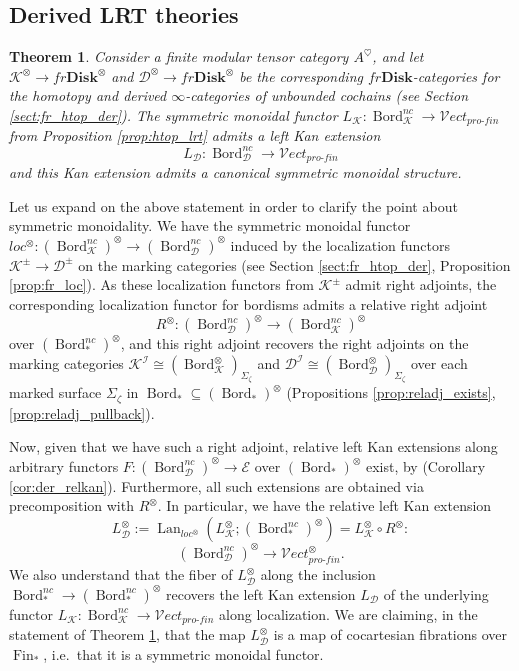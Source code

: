 \documentclass[reqno]{amsart}
\newtheorem{theorem}[lemma]{Theorem}
\theoremstyle{definition}
\newcommand{\mcl}[1]{\mathcal{#1}}
\newcommand{\msc}[1]{\mathscr{#1}}
\newcommand{\opn}[1]{\operatorname{#1}}
\newcommand{\ot}{\otimes}
\newcommand{\Vect}{\msc{V}\!ect}
\newcommand{\Disk}{\mathbf{Disk}}
\newcommand{\pf}{pro\text{-}fin}
\DeclareMathOperator{\Fin}{Fin}
\DeclareMathOperator{\Bord}{Bord}
\renewcommand{\1}{\mathbf{1}}
\begin{document}
\subsection{Derived LRT theories}

\begin{theorem}\label{thm:der_lrt}
Consider a finite modular tensor category $A^{\heartsuit}$, and let $\msc{K}^{\ot}\to fr\Disk^{\ot}$ and $\msc{D}^{\ot}\to fr\Disk^{\ot}$ be the corresponding $fr\Disk$-categories for the homotopy and derived $\infty$-categories of unbounded cochains (see Section \ref{sect:fr_htop_der}).  The symmetric monoidal functor $L_{\msc{K}}:\Bord_{\msc{K}}^{nc}\to \Vect_{\pf}$ from Proposition \ref{prop:htop_lrt} admits a left Kan extension
\[
L_{\msc{D}}:\Bord_{\msc{D}}^{nc}\to \Vect_{\pf}
\]
and this Kan extension admits a canonical symmetric monoidal structure.
\end{theorem}

Let us expand on the above statement in order to clarify the point about symmetric monoidality.  We have the symmetric monoidal functor $loc^{\ot}:(\Bord_{\msc{K}}^{nc})^{\ot}\to (\Bord_{\msc{D}}^{nc})^{\ot}$ induced by the localization functors $\msc{K}^{\pm}\to\msc{D}^{\pm}$ on the marking categories (see Section \ref{sect:fr_htop_der}, Proposition \ref{prop:fr_loc}).  As these localization functors from $\msc{K}^{\pm}$ admit right adjoints, the corresponding localization functor for bordisms admits a relative right adjoint
\[
R^{\ot}:(\Bord_{\msc{D}}^{nc})^{\ot}\to (\Bord_{\msc{K}}^{nc})^{\ot}
\]
over $(\Bord_{\ast}^{nc})^{\ot}$, and this right adjoint recovers the right adjoints on the marking categories $\msc{K}^{\mcl{I}}\cong(\Bord_{\msc{K}}^{\ot})_{\Sigma_{\zeta}}$ and $\msc{D}^{\mcl{I}}\cong(\Bord_{\msc{D}}^{\ot})_{\Sigma_{\zeta}}$ over each marked surface $\Sigma_{\zeta}$ in $\Bord_{\ast}\subseteq (\Bord_{\ast})^{\ot}$ (Propositions \ref{prop:reladj_exists}, \ref{prop:reladj_pullback}).
\par

Now, given that we have such a right adjoint, relative left Kan extensions along arbitrary functors $F:(\Bord_{\msc{D}}^{nc})^{\ot}\to \msc{E}$ over $(\Bord_{\ast})^{\ot}$ exist, by (Corollary \ref{cor:der_relkan}). Furthermore, all such extensions are obtained via precomposition with $R^{\ot}$.  In particular, we have the relative left Kan extension
\begin{equation}
L_{\msc{D}}^{\ot}:=\opn{Lan}_{loc^{\ot}}\left(L^{\ot}_{\msc{K}};(\Bord_{\ast}^{nc})^{\ot}\right)=L^{\ot}_{\msc{K}}\circ R^{\ot}:
\end{equation}
\[
(\Bord_{\msc{D}}^{nc})^{\ot}\to \Vect_{\pf}^{\ot}.
\]
We also understand that the fiber of $L_{\msc{D}}^{\ot}$ along the inclusion $\Bord^{nc}_{\ast}\to (\Bord^{nc}_{\ast})^{\ot}$ recovers the left Kan extension $L_{\msc{D}}$ of the underlying functor $L_{\msc{K}}:\Bord_{\msc{K}}^{nc}\to \Vect_{\pf}$ along localization.  We are claiming, in the statement of Theorem \ref{thm:der_lrt}, that the map $L_{\msc{D}}^{\ot}$ is a map of cocartesian fibrations over $\Fin_{\ast}$, i.e.\ that it is a symmetric monoidal functor.
\end{document}
